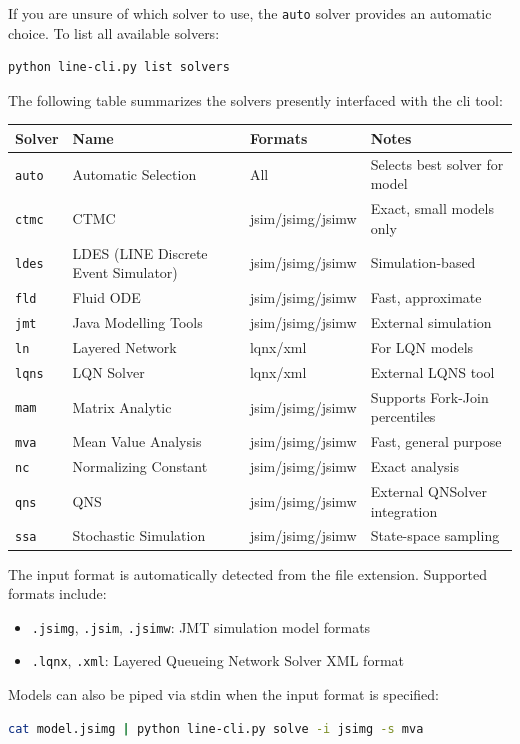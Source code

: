 If you are unsure of which solver to use, the \texttt{auto} solver provides an automatic choice. To list all available solvers:
\begin{lstlisting}[language=bash, basicstyle=\ttfamily\footnotesize]
python line-cli.py list solvers
\end{lstlisting}
The following table summarizes the solvers presently interfaced with the cli tool:
\begin{center}
\begin{tabular}{|l|l|l|l|}
\hline
\textbf{Solver} & \textbf{Name} & \textbf{Formats} & \textbf{Notes} \\
\hline
\texttt{auto} & Automatic Selection & All & Selects best solver for model \\
\texttt{ctmc} & CTMC & jsim/jsimg/jsimw & Exact, small models only \\
\texttt{ldes} & LDES (LINE Discrete Event Simulator) & jsim/jsimg/jsimw & Simulation-based \\
\texttt{fld} & Fluid ODE & jsim/jsimg/jsimw & Fast, approximate \\
\texttt{jmt} & Java Modelling Tools & jsim/jsimg/jsimw & External simulation \\
\texttt{ln} & Layered Network & lqnx/xml & For LQN models \\
\texttt{lqns} & LQN Solver & lqnx/xml & External LQNS tool \\
\texttt{mam} & Matrix Analytic & jsim/jsimg/jsimw & Supports Fork-Join percentiles \\
\texttt{mva} & Mean Value Analysis & jsim/jsimg/jsimw & Fast, general purpose \\
\texttt{nc} & Normalizing Constant & jsim/jsimg/jsimw & Exact analysis \\
\texttt{qns} & QNS & jsim/jsimg/jsimw & External QNSolver integration \\
\texttt{ssa} & Stochastic Simulation & jsim/jsimg/jsimw & State-space sampling \\
\hline
\end{tabular}
\end{center}

The input format is automatically detected from the file extension. Supported formats include:
\begin{itemize}
\item \texttt{.jsimg}, \texttt{.jsim}, \texttt{.jsimw}: JMT simulation model formats
\item \texttt{.lqnx}, \texttt{.xml}: Layered Queueing Network Solver XML format
\end{itemize}
Models can also be piped via stdin when the input format is specified:
\begin{lstlisting}[language=bash, basicstyle=\ttfamily\footnotesize]
cat model.jsimg | python line-cli.py solve -i jsimg -s mva
\end{lstlisting}

